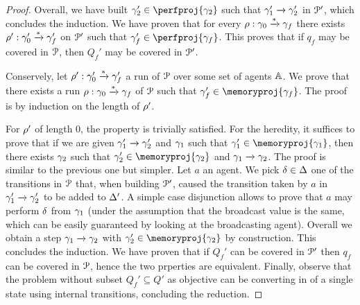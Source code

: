 \begin{proof}
	Overall, we have built $\config_2' \in \perfproj{\config_2}$ such that $\gamma_1' \xrightarrow{} \gamma_2'$ in $\mathcal{P}'$, which concludes the induction. We have proven that for every $\rho: \gamma_0 \xrightarrow{*} \gamma_f$ there exists $\rho': \gamma_0' \xrightarrow{*} \gamma_f'$ on $\mathcal{P}'$ such that $\config_f' \in \perfproj{\config_f}$. This proves that if $q_f$ may be covered in $\mathcal{P}$, then $Q_f'$ may be covered in $\mathcal{P}'$. 

	Conservely, let $\rho' : \gamma_0' \xrightarrow{*} \gamma_f'$ a run of $\mathcal{P}$ over some set of agents $\mathbb{A}$. We prove that there exists a run $\rho: \gamma_0 \xrightarrow{*} \gamma_f$ of $\mathcal{P}$ such that $\config_f' \in \memoryproj{\config_f}$. The proof is by induction on the length of $\rho'$. 

	For $\rho'$ of length $0$, the property is trivially satisfied. For the heredity, it suffices to prove that if we are given $\gamma_1' \xrightarrow{} \gamma_2'$ and $\gamma_1$ such that $\config_1' \in \memoryproj{\config_1}$, then there exists $\gamma_2$ such that $\config_2' \in \memoryproj{\config_2}$ and $\gamma_1 \xrightarrow{} \gamma_2$. The proof is similar to the previous one but simpler. Let $a$ an agent. We pick $\delta \in \Delta$ one of the transitions in $\mathcal{P}$ that, when building $\mathcal{P}'$, caused the transition taken by $a$ in $\gamma_1' \xrightarrow{} \gamma_2'$ to be added to $\Delta'$. A simple case disjunction allows to prove that $a$ may perform $\delta$ from $\gamma_1$ (under the assumption that the broadcast value is the same, which can be easily guaranteed by looking at the broadcasting agent). Overall we obtain a step $\gamma_1 \xrightarrow{} \gamma_2$ with $\config_2' \in \memoryproj{\config_2}$ by construction. This concludes the induction. We have proven that if $Q_f'$ can be covered in $\mathcal{P}'$ then $q_f$ can be covered in $\mathcal{P}$, hence the two prperties are equivalent.
	Finally, observe that the \COVER problem without subset $Q_f' \subseteq Q'$ as objective can be converting in \COVER of a single state using internal transitions, concluding the reduction.
\end{proof}
